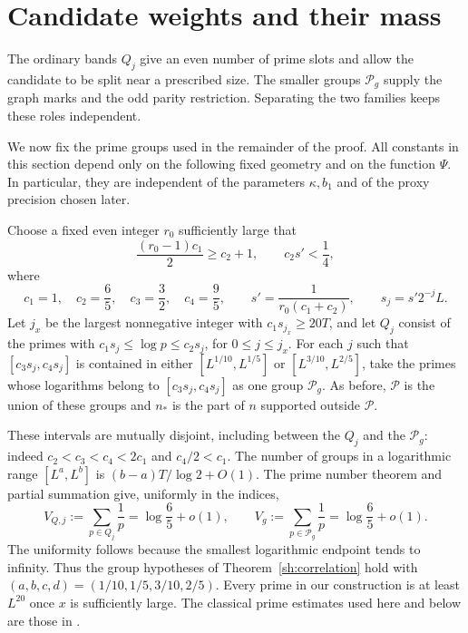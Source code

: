 \section{Candidate weights and their mass}\label{wt:section}

The ordinary bands $Q_j$ give an even number of prime slots and allow
the candidate to be split near a prescribed size. The smaller groups
$\mathcal P_g$ supply the graph marks and the odd parity restriction.
Separating the two families keeps these roles independent.

We now fix the prime groups used in the remainder of the proof. All
constants in this section depend only on the following fixed geometry
and on the function $\Psi$. In particular, they are independent of the
parameters $\kappa,b_1$ and of the proxy precision chosen later.

Choose a fixed even integer $r_0$ sufficiently large that
\[
 \frac{(r_0-1)c_1}{2}\ge c_2+1,
 \qquad c_2s'<\frac14,
\]
where
\begin{equation}\label{wt:geometry}
 c_1=1,\quad c_2=\frac65,\quad c_3=\frac32,\quad c_4=\frac95,
 \qquad s'=\frac1{r_0(c_1+c_2)},\qquad s_j=s'2^{-j}L.
\end{equation}
Let $j_x$ be the largest nonnegative integer with $c_1s_{j_x}\ge20T$,
and let $Q_j$ consist of the primes with
$c_1s_j\le\log p\le c_2s_j$, for $0\le j\le j_x$.
For each $j$ such that $[c_3s_j,c_4s_j]$ is contained in either
$[L^{1/10},L^{1/5}]$ or $[L^{3/10},L^{2/5}]$, take the primes whose
logarithms belong to $[c_3s_j,c_4s_j]$ as one group $\mathcal P_g$.
As before, $\mathcal P$ is the union of these groups and $n_*$ is the
part of $n$ supported outside $\mathcal P$.

These intervals are mutually disjoint, including between the $Q_j$
and the $\mathcal P_g$: indeed $c_2<c_3<c_4<2c_1$ and $c_4/2<c_1$.
The number of groups in a logarithmic range $[L^a,L^b]$ is
$(b-a)T/\log2+O(1)$. The prime number theorem and partial summation give,
uniformly in the indices,
\begin{equation}\label{wt:band-masses}
 V_{Q,j}:=\sum_{p\in Q_j}\frac1p=\log\frac65+o(1),
 \qquad
 V_g:=\sum_{p\in\mathcal P_g}\frac1p=\log\frac65+o(1).
\end{equation}
The uniformity follows because the smallest logarithmic endpoint tends
to infinity. Thus the group hypotheses of
Theorem~\ref{sh:correlation} hold with
$(a,b,c,d)=(1/10,1/5,3/10,2/5)$. Every prime in our construction is at
least $L^{20}$ once $x$ is sufficiently large. The classical prime
estimates used here and below are those in
\cite[Section ``Notation and preliminary estimates'']{SmoothShifted}.

